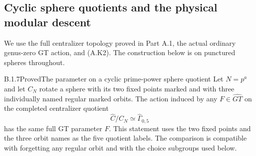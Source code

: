 \subsection{Cyclic sphere quotients and the physical modular descent}

We use the full centralizer topology proved in Part A.1, the actual
ordinary genus-zero GT action, and (A.K2).  The construction below is
on punctured spheres throughout.

\begin{result}{B.1.7}{Proved}{The parameter on a cyclic prime-power sphere quotient}
Let $N=p^a$ and let $C_N$ rotate a sphere with its two fixed points
marked and with three individually named regular marked orbits.
The action induced by any $F\in\widehat{GT}$ on the completed
centralizer quotient
\[
 \widehat C/C_N\simeq\widehat\Gamma_{0,5}
\]
has the same full GT parameter $F$.  This statement uses the two
fixed points and the three orbit names as the five quotient labels.
The comparison is compatible with forgetting any regular orbit and
with the choice subgroups used below.
\end{result}
